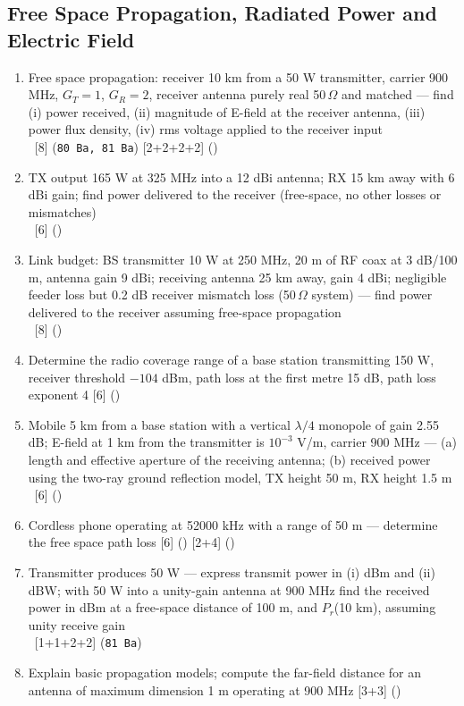 \documentclass[12pt]{article}
\newcommand{\enter}{\\\textcolor{white}{1}}
\begin{document}
  \subsection{Free Space Propagation, Radiated Power and Electric Field}
    \begin{enumerate}[topsep=0pt, noitemsep]
      \item Free space propagation: receiver 10 km from a 50 W transmitter, carrier 900 MHz,
        $G_T{=}1$, $G_R{=}2$, receiver antenna purely real 50\,$\Omega$ and matched --- find
        (i) power received, (ii) magnitude of E-field at the receiver antenna,
        (iii) power flux density, (iv) rms voltage applied to the receiver input
        \enter\hfill [8] (\texttt{80 Ba, 81 Ba}) [2+2+2+2] ()
      \item TX output 165 W at 325 MHz into a 12 dBi antenna; RX 15 km away with 6 dBi gain;
        find power delivered to the receiver (free-space, no other losses or mismatches)
        \enter\hfill [6] ()
      \item Link budget: BS transmitter 10 W at 250 MHz, 20 m of RF coax at 3 dB/100 m,
        antenna gain 9 dBi; receiving antenna 25 km away, gain 4 dBi; negligible feeder loss
        but 0.2 dB receiver mismatch loss (50\,$\Omega$ system) --- find power delivered to the
        receiver assuming free-space propagation
        \enter\hfill [8] ()
      \item Determine the radio coverage range of a base station transmitting 150 W,
        receiver threshold $-104$ dBm, path loss at the first metre 15 dB,
        path loss exponent 4 \hfill [6] ()
      \item Mobile 5 km from a base station with a vertical $\lambda/4$ monopole of gain 2.55 dB;
        E-field at 1 km from the transmitter is $10^{-3}$ V/m, carrier 900 MHz ---
        (a) length and effective aperture of the receiving antenna; (b) received power using the
        two-ray ground reflection model, TX height 50 m, RX height 1.5 m
        \enter\hfill [6] ()
      \item Cordless phone operating at 52000 kHz with a range of 50 m ---
        determine the free space path loss \hfill [6] () [2+4] ()
      \item Transmitter produces 50 W --- express transmit power in (i) dBm and (ii) dBW;
        with 50 W into a unity-gain antenna at 900 MHz find the received power in dBm at a
        free-space distance of 100 m, and $P_r$(10 km), assuming unity receive gain
        \enter\hfill [1+1+2+2] (\texttt{81 Ba})
      \item Explain basic propagation models; compute the far-field distance for an antenna of
        maximum dimension 1 m operating at 900 MHz \hfill [3+3] ()
    \end{enumerate}
\end{document}
